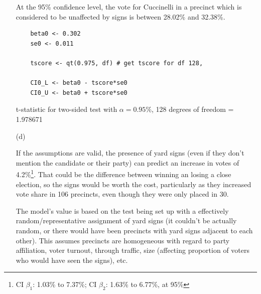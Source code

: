 \documentclass[12pt,letterpaper]{article}
\begin{document}
\begin{enumerate}
	At the 95\% confidence level, the vote for Cuccinelli in a precinct which is considered
	to be unaffected by signs is between  28.02\% and 32.38\%. 

	\begin{lstlisting}
    beta0 <- 0.302
    se0 <- 0.011

  	tscore <- qt(0.975, df) # get tscore for df 128,

    CI0_L <- beta0 - tscore*se0
    CI0_U <- beta0 + tscore*se0
	\end{lstlisting}
    
  t-statistic for two-sided test with $\alpha = 0.95\%$, 128 degrees of freedom = 1.978671

	\item [(d)] %

  If the assumptions are valid, the presence of yard signs (even if they don't mention the candidate or their party) can predict an increase in votes of 4.2\%\footnote{CI $\beta_1$: 1.03\% to 7.37\%;  CI $\beta_2$: 1.63\% to 6.77\%, at 95\%}.  That could be the difference between winning an losing a close election, so the signs would be worth the cost, particularly as they increased vote share in 106 precincts, even though they were only placed in 30.

The model's value is based on the test being set up with a effectively random/representative assignment of yard signs (it couldn't be actually random, or there would have been precincts with yard signs adjacent to each other).  This assumes precincts are homogeneous with regard to party affiliation, voter turnout, through traffic, size (affecting proportion of voters who would have seen the signs), etc.


\end{enumerate}
\end{document}
